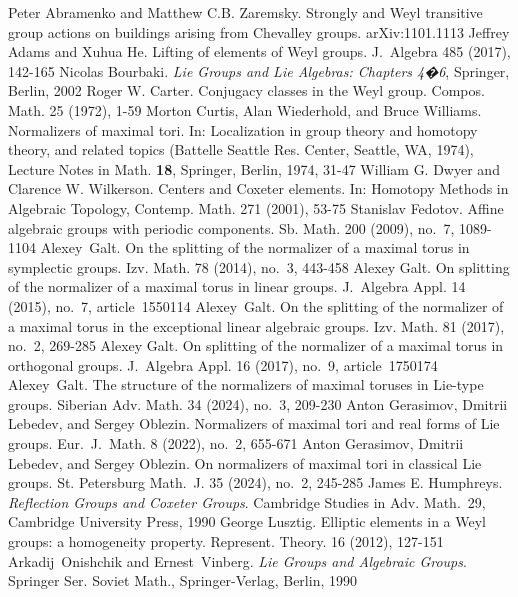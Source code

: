 \documentclass[a4paper,12pt]{amsart}
\theoremstyle{plain}
\theoremstyle{definition}
\begin{document}
%
\begin{thebibliography}{}
%
Peter Abramenko and Matthew C.B. Zaremsky. Strongly and Weyl transitive group actions on buildings arising from Chevalley groups. arXiv:1101.1113 %
%
Jeffrey Adams and Xuhua He. Lifting of elements of Weyl groups. J.~Algebra 485 (2017), 142-165
%
Nicolas Bourbaki. \emph{Lie Groups and Lie Algebras: Chapters 4�6}, Springer, Berlin, 2002
%
Roger W. Carter. Conjugacy classes in the Weyl group. Compos. Math. 25 (1972), 1-59
%
Morton Curtis, Alan Wiederhold, and Bruce Williams. Normalizers of maximal tori. In: Localization in group theory and homotopy theory, and related topics (Battelle Seattle Res. Center, Seattle, WA, 1974), Lecture Notes in Math. {\bf18}, Springer, Berlin, 1974, 31-47
%
William G. Dwyer and Clarence W. Wilkerson. Centers and Coxeter elements. In: Homotopy Methods in Algebraic Topology, Contemp. Math. 271 (2001), 53-75
%
Stanislav Fedotov. Affine algebraic groups with periodic components. Sb. Math. 200 (2009), no.~7, 1089-1104
%
Alexey~Galt. On the splitting of the normalizer of a maximal torus in symplectic groups. Izv. Math. 78 (2014), no.~3, 443-458
%
Alexey Galt. On splitting of the normalizer of a maximal torus in linear groups. J.~Algebra Appl. 14 (2015), no.~7, article~1550114  %
%
Alexey~Galt. On the splitting of the normalizer of a maximal torus in the exceptional linear algebraic groups. Izv. Math. 81 (2017), no.~2, 269-285
%
Alexey Galt. On splitting of the normalizer of a maximal torus in orthogonal groups. J.~Algebra Appl. 16 (2017), no.~9, article~1750174 %
%
Alexey~Galt. The structure of the normalizers of maximal toruses in Lie-type groups. Siberian Adv. Math. 34 (2024), no.~3, 209-230
%
Anton Gerasimov, Dmitrii Lebedev, and Sergey Oblezin. Normalizers of maximal tori and real forms of Lie groups. Eur.~J.~Math. 8 (2022), no.~2, 655-671
%
Anton Gerasimov, Dmitrii Lebedev, and Sergey Oblezin. On normalizers of maximal tori in classical Lie groups. St. Petersburg Math.~J. 35 (2024), no.~2, 245-285
%
James E. Humphreys. \emph{Reflection Groups and Coxeter Groups}. Cambridge Studies in Adv. Math.~29, Cambridge University Press, 1990
%
George Lusztig. Elliptic elements in a Weyl groups: a homogeneity property. Represent. Theory. 16 (2012), 127-151
%
Arkadij~Onishchik and Ernest~Vinberg. {\it Lie Groups and Algebraic Groups}.  Springer Ser. Soviet Math., Springer-Verlag, Berlin, 1990

\end{thebibliography}
\end{document}
